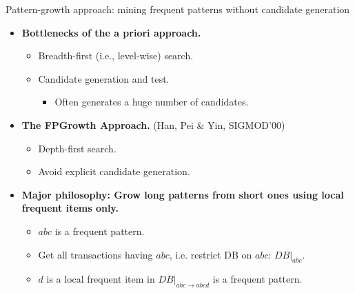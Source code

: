 \documentclass[aspectratio=169,t,xcolor=dvipsnames]{beamer}
\begin{document}
 {
    \begin{frame}{Pattern-growth approach: mining frequent patterns without candidate generation}
        \begin{itemize}
            \item \textbf{Bottlenecks of the a priori approach.}
            \begin{itemize}
                \item Breadth-first (i.e., level-wise) search.
                \item Candidate generation and test.
                \begin{itemize}
                    \item Often generates a huge number of candidates.
                \end{itemize}
            \end{itemize}
            \item \textbf{The FPGrowth Approach.} (Han, Pei \& Yin, SIGMOD'00)
            \begin{itemize}
                \item Depth-first search.
                \item Avoid explicit candidate generation.
            \end{itemize}
            \item \textbf{Major philosophy: Grow long patterns from short ones using local frequent items only.}
            \begin{itemize}
                \item $abc$ is a frequent pattern.
                \item Get all transactions having $abc$, i.e. restrict DB on $abc$: $DB|_{abc}$.
                \item $d$ is a local frequent item in $DB|_{abc \rightarrow abcd}$ is a frequent pattern.
            \end{itemize}
        \end{itemize}
    \end{frame}
  }
\end{document}
